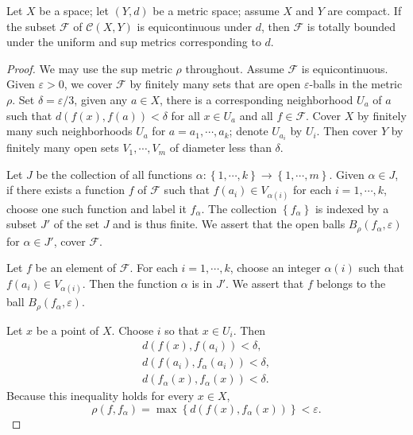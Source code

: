 \begin{lemma}
  Let \( X \) be a space; let \( (Y, d) \) be a metric space; assume \( X \) and \( Y \) are compact.
  If the subset \( \mathcal{F} \) of \( \mathcal{C}(X, Y) \) is equicontinuous under \( d \), then \( \mathcal{F} \) is totally bounded under the uniform and sup metrics corresponding to \( d \).
\end{lemma}
\begin{proof}
  We may use the sup metric \( \rho \) throughout.
  Assume \( \mathcal{F} \) is equicontinuous.
  Given \( \varepsilon > 0 \), we cover \( \mathcal{F} \) by finitely many sets that are open \( \varepsilon \)-balls in the metric \( \rho \).
  Set \( \delta = \varepsilon / 3 \), given any \( a \in X \), there is a corresponding neighborhood \( U_a \) of \( a \) such that \( d(f(x), f(a)) < \delta \) for all \( x \in U_a \) and all \( f \in \mathcal{F} \).
  Cover \( X \) by finitely many such neighborhoods \( U_a \) for \( a = a_1, \cdots, a_k \);
  denote \( U_{a_i} \) by \( U_i \).
  Then cover \( Y \) by finitely many open sets \( V_1, \cdots, V_m \) of diameter less than \( \delta \).

  Let \( J \) be the collection of all functions \( \alpha: \left\lbrace 1, \cdots, k \right\rbrace \to \left\lbrace 1, \cdots, m \right\rbrace \).
  Given \( \alpha \in J \), if there exists a function \( f \) of \( \mathcal{F} \) such that \( f(a_i) \in V_{\alpha(i)} \) for each \( i = 1,\cdots, k \), choose one such function and label it \( f_\alpha \).
  The collection \( \left\lbrace f_{\alpha} \right\rbrace \) is indexed by a subset \( J' \) of the set \( J \) and is thus finite.
  We assert that the open balls \( B_{\rho}(f_{\alpha}, \varepsilon) \) for \( \alpha \in J' \), cover \( \mathcal{F} \).

  Let \( f \) be an element of \( \mathcal{F} \).
  For each \( i = 1, \cdots, k \), choose an integer \( \alpha(i) \) such that \( f(a_i) \in V_{\alpha(i)} \).
  Then the function \( \alpha \) is in \( J' \).
  We assert that \( f \) belongs to the ball \( B_{\rho}(f_{\alpha}, \varepsilon) \).

  Let \( x \) be a point of \( X \).
  Choose \( i \) so that \( x \in U_i \).
  Then
  \begin{align*}
  d(f(x), f(a_i)) < \delta,\\
  d(f(a_i), f_{\alpha}(a_i)) < \delta,\\
  d(f_{\alpha}(x), f_{\alpha}(x)) < \delta.
  \end{align*}
  Because this inequality holds for every \( x \in X \),
  \[
    \rho(f, f_{\alpha}) = \max \left\lbrace d(f(x), f_{\alpha}(x)) \right\rbrace < \varepsilon.
  \]
\end{proof}

